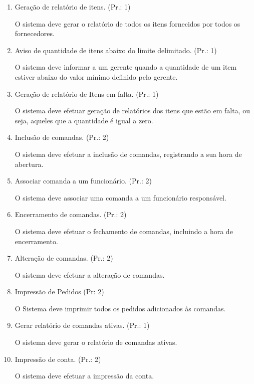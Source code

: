 \begin{enumerate}[
	label=RF\arabic{*}, 
	ref=(RF\arabic{*}),
	leftmargin=1.5em,
	itemindent=4.5em]
O sistema deve efetuar a consulta dos dados dos itens.\par
\item Geração de relatório de itens. (Pr.: 1)\par
O sistema deve gerar o relatório de todos os itens fornecidos por todos os fornecedores.\par
\item Aviso de quantidade de itens abaixo do limite delimitado. (Pr.: 1)\par
O sistema deve informar a um gerente quando a quantidade de um item estiver abaixo do valor mínimo definido pelo gerente.\par
\item Geração de relatório de Itens em falta. (Pr.: 1)\par
O sistema deve efetuar geração de relatórios dos itens que estão em falta, ou seja, aqueles que a quantidade é igual a zero.\par
\item Inclusão de comandas. (Pr.: 2)\par
O sistema deve efetuar a inclusão de comandas, registrando a sua hora de abertura.\par
\item Associar comanda a um funcionário. (Pr.: 2)\par
O sistema deve associar uma comanda a um funcionário responsável.\par
\item Encerramento de comandas. (Pr.: 2)\par
O sistema deve efetuar o fechamento de comandas, incluindo a hora de encerramento.\par
\item Alteração de comandas. (Pr.: 2)\par
O sistema deve efetuar a alteração de comandas.\par
\item Impressão de Pedidos (Pr: 2)\par
O Sistema deve imprimir todos os pedidos adicionados às comandas.\par
\item Gerar relatório de comandas ativas. (Pr.: 1)\par
O sistema deve gerar o relatório de comandas ativas.\par
\item Impressão de conta. (Pr.: 2)\par
O sistema deve efetuar a impressão da conta.\par

\end{enumerate}
